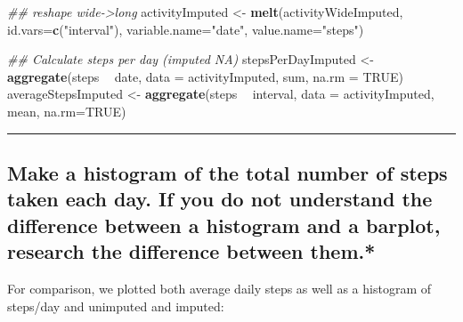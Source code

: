 \documentclass[]{article}
\newenvironment{Shaded}{\begin{snugshade}}{\end{snugshade}}
\newcommand{\CommentTok}[1]{\textcolor[rgb]{0.56,0.35,0.01}{\textit{#1}}}
\newcommand{\DataTypeTok}[1]{\textcolor[rgb]{0.13,0.29,0.53}{#1}}
\newcommand{\KeywordTok}[1]{\textcolor[rgb]{0.13,0.29,0.53}{\textbf{#1}}}
\newcommand{\NormalTok}[1]{#1}
\newcommand{\OperatorTok}[1]{\textcolor[rgb]{0.81,0.36,0.00}{\textbf{#1}}}
\newcommand{\OtherTok}[1]{\textcolor[rgb]{0.56,0.35,0.01}{#1}}
\newcommand{\StringTok}[1]{\textcolor[rgb]{0.31,0.60,0.02}{#1}}
\begin{document}
\begin{Shaded}
\begin{Highlighting}[]
\CommentTok{## reshape wide->long}
\NormalTok{activityImputed <-}\StringTok{ }\KeywordTok{melt}\NormalTok{(activityWideImputed, }
                        \DataTypeTok{id.vars=}\KeywordTok{c}\NormalTok{(}\StringTok{"interval"}\NormalTok{), }
                        \DataTypeTok{variable.name=}\StringTok{"date"}\NormalTok{,}
                        \DataTypeTok{value.name=}\StringTok{"steps"}\NormalTok{)}

\CommentTok{## Calculate steps per day (imputed NA)}
\NormalTok{stepsPerDayImputed <-}\StringTok{ }\KeywordTok{aggregate}\NormalTok{(steps }\OperatorTok{~}\StringTok{ }\NormalTok{date, }\DataTypeTok{data =}\NormalTok{ activityImputed, sum, }\DataTypeTok{na.rm =} \OtherTok{TRUE}\NormalTok{)}
\NormalTok{averageStepsImputed <-}\StringTok{ }\KeywordTok{aggregate}\NormalTok{(steps }\OperatorTok{~}\StringTok{ }\NormalTok{interval, }\DataTypeTok{data =}\NormalTok{ activityImputed, mean, }\DataTypeTok{na.rm=}\OtherTok{TRUE}\NormalTok{)}
\end{Highlighting}
\end{Shaded}

\begin{center}\rule{0.5\linewidth}{\linethickness}\end{center}

\hypertarget{make-a-histogram-of-the-total-number-of-steps-taken-each-day.-if-you-do-not-understand-the-difference-between-a-histogram-and-a-barplot-research-the-difference-between-them.}{%
\subsection{Make a histogram of the total number of steps taken each
day. If you do not understand the difference between a histogram and a
barplot, research the difference between
them.*}\label{make-a-histogram-of-the-total-number-of-steps-taken-each-day.-if-you-do-not-understand-the-difference-between-a-histogram-and-a-barplot-research-the-difference-between-them.}}

For comparison, we plotted both average daily steps as well as a
histogram of steps/day and unimputed and imputed:
\end{document}
